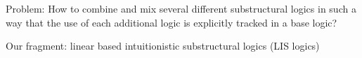 Problem: How to combine and mix several different substructural logics
in such a way that the use of each additional logic is explicitly
tracked in a base logic?

Our fragment: linear based intuitionistic substructural logics (LIS logics)
